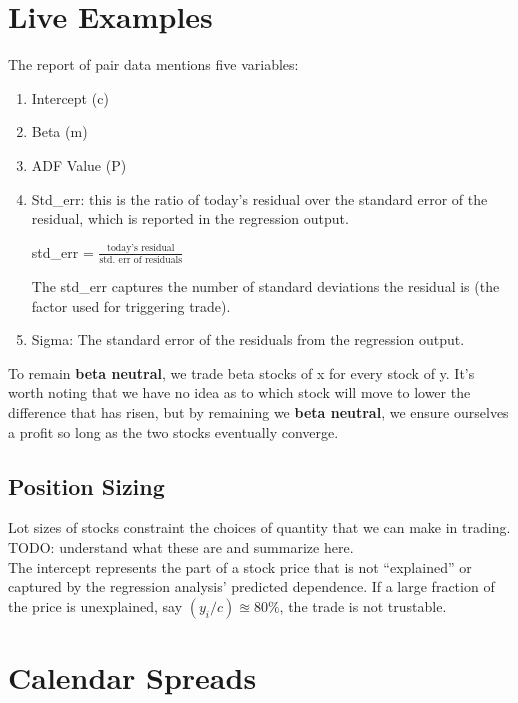 \documentclass{article}
\begin{document}
\section{Live Examples}
The report of pair data mentions five variables:
\begin{enumerate}
    \item Intercept (c)
    \item Beta (m)
    \item ADF Value (P)
    \item Std\_err: this is the ratio of today's residual over the standard 
    error of the residual, which is reported in the regression output.
    \begin{center}
        std\_err = $\frac{\text{today's residual}}{\text{std. err of residuals}}$
    \end{center}
    The std\_err captures the number of standard deviations the residual is (the factor used for triggering trade).
    \item Sigma: The standard error of the residuals from the regression output.
\end{enumerate}
To remain \textbf{beta neutral}, we trade beta stocks of x for every stock of y.
It's worth noting that we have no idea as to which stock will move to lower the
difference that has risen, but by remaining we \textbf{beta neutral}, we ensure
ourselves a profit so long as the two stocks eventually converge.
\begin{center}
\end{center}
\subsection{Position Sizing}
Lot sizes of stocks constraint the choices of quantity that we can make in trading. TODO: understand what these are and summarize here.\\
The intercept represents the part of a stock price that is not ``explained'' or
captured by the regression analysis' predicted dependence. If a large fraction
of the price is unexplained, say $(y_i/c) \approxeq 80\%$, the trade is not trustable.
\section{Calendar Spreads}
\end{document}
